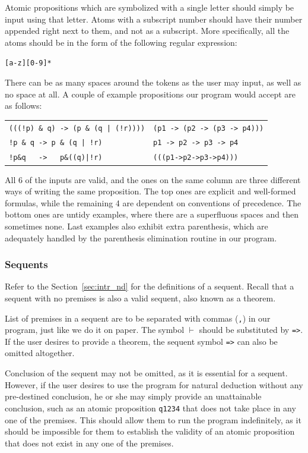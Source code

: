 \documentclass{article}
\begin{document}
Atomic propositions which are symbolized with a single letter should simply
be input using that letter. Atoms with a subscript number should have their
number appended right next to them, and not as a subscript. More specifically,
all the atoms should be in the form of the following regular expression:

\begin{center}
\verb|[a-z][0-9]*|
\end{center}

There can be as many spaces around the tokens as the user may input,
as well as no space at all. A couple of example propositions our program
would accept are as follows:

\begin{center}
	\begin{tabular}{l | l}
		\verb^(((!p) & q) -> (p & (q | (!r))))^ & \verb^(p1 -> (p2 -> (p3 -> p4)))^\\
		\verb^!p & q -> p & (q | !r)^           & \verb^p1 -> p2 -> p3 -> p4^\\
		\verb^!p&q   ->   p&((q)|!r)^           & \verb^(((p1->p2->p3->p4)))^
	\end{tabular}
\end{center}

All 6 of the inputs are valid, and the ones on the same column are
three different ways of writing the same proposition. The top ones are
explicit and well-formed formulas, while the remaining 4 are dependent
on conventions of precedence. The bottom ones are untidy examples, where
there are a superfluous spaces and then sometimes none. Last examples
also exhibit extra parenthesis, which are adequately handled by the
parenthesis elimination routine in our program.

\subsubsection{Sequents}

Refer to the Section~\ref{sec:intr_nd} for the definitions of a sequent.
Recall that a sequent with no premises is also a valid sequent, also known
as a theorem.

List of premises in a sequent are to be separated with commas (\verb|,|)
in our program, just like we do it on paper. The symbol $\vdash$ should
be substituted by \verb|=>|.  If the user desires to provide a theorem,
the sequent symbol \verb|=>| can also be omitted altogether.

Conclusion of the sequent may not be omitted, as it is essential for a
sequent. However, if the user desires to use the program for natural deduction
without any pre-destined conclusion, he or she may simply provide an unattainable
conclusion, such as an atomic proposition \verb|q1234| that does not take place
in any one of the premises. This should allow them to run the program
indefinitely, as it should be impossible for them to establish the validity
of an atomic proposition that does not exist in any one of the premises.
\end{document}
